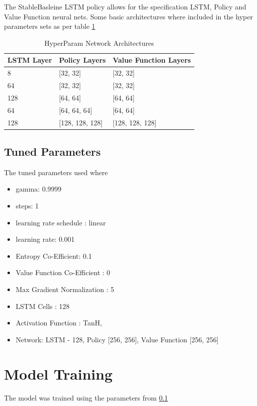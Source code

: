 \documentclass[oneside,12pt]{Classes/RoboticsLaTeX}
\begin{document}
The StableBasleine \citep{stable-baselines} LSTM policy allows for the specification LSTM, Policy and Value Function neural nets.  Some basic architectures where included in the hyper parameters sets as per table \ref{table:hyperparamna}

\begin{table}[h]
\begin{tabular}{|l|l|l|}
\hline
\textbf{LSTM Layer} & \textbf{Policy Layers} & \textbf{Value Function Layers} \\
\hline
8 & [32, 32] & [32, 32] \\
\hline
64 & [32, 32] & [32, 32] \\
\hline
128 & [64, 64] & [64, 64] \\
\hline
64 & [64, 64, 64] & [64, 64]\\
\hline
128 & [128, 128, 128] & [128, 128, 128] \\
\hline
\end{tabular}
\caption{HyperParam Network Architectures} \label{table:hyperparamna}
\end{table}

\subsection{Tuned Parameters} \label{section:tunedHP}
The tuned parameters used where
\begin{itemize}
    \item gamma: 0.9999
    \item steps: 1
    \item learning rate schedule : linear
    \item learning rate: 0.001
    \item Entropy Co-Efficient: 0.1
    \item Value Function Co-Efficient : 0
    \item Max Gradient Normalization : 5
    \item LSTM Cells : 128
    \item Activation Function : TanH,
    \item Network: LSTM - 128, Policy [256, 256], Value Function [256, 256]
\end{itemize}

\section{Model Training}
The model was trained using the parameters from \ref{section:tunedHP}
\end{document}
